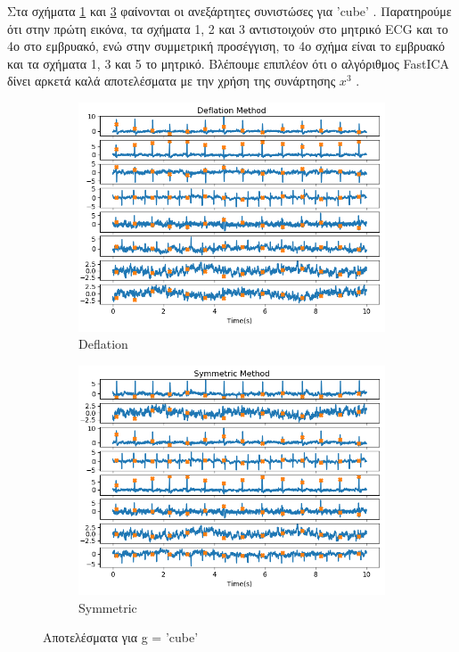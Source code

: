 \noindent Στα σχήματα \ref{fig:5.31a} και \ref{fig:5.31b} φαίνονται οι ανεξάρτητες συνιστώσες για \en 'cube' \gr. Παρατηρούμε ότι στην πρώτη εικόνα, τα σχήματα 1, 2 και 3 αντιστοιχούν στο μητρικό \en ECG \gr και το 4ο στο εμβρυακό, ενώ στην συμμετρική προσέγγιση, το 4ο σχήμα είναι το εμβρυακό και τα σχήματα 1, 3 και 5 το μητρικό. Βλέπουμε επιπλέον ότι ο αλγόριθμος \en FastICA \gr δίνει αρκετά καλά αποτελέσματα με την χρήση της συνάρτησης \en $x^3$ \gr.
\begin{figure}[H]
    \centering
    \begin{subfigure}{0.48 \textwidth}
        \centering
       \includegraphics[width=\textwidth]{daisy/cube_def.png} \en
        \caption{Deflation} \gr
        \label{fig:5.31a}
    \end{subfigure}
    \hfill
    \begin{subfigure}{0.48 \textwidth}
        \centering
       \includegraphics[width=\textwidth]{daisy/cube_sym.png} \en
        \en
        \caption{Symmetric} \gr
        \label{fig:5.31b}
    \end{subfigure}
    \gr
    \caption{Αποτελέσματα για \en g = 'cube' \gr}
\end{figure}
